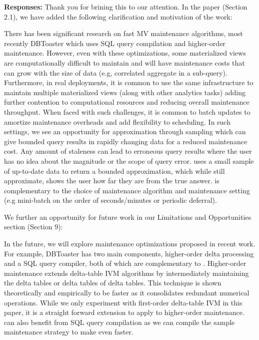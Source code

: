 {\bf Responses:} Thank you for brining this to our attention. In the paper (Section 2.1), we have added the following clarification and motivation of the work:
\begin{displayquote}
There has been significant research on fast MV maintenance algorithms, most recently DBToaster \cite{DBLP:journals/vldb/KochAKNNLS14} which uses SQL query compilation and higher-order maintenance.
However, even with these optimizations, some materialized views are computationally difficult to maintain and will have maintenance costs that can grow with the size of data (e.g, correlated aggregate in a sub-query).
Furthermore, in real deployments, it is common to use the same infrastructure to maintain multiple materialized views (along with other analytics tasks) adding further contention to computational resources and reducing overall maintenance throughput.
When faced with such challenges, it is common to batch updates to amortize maintenance overheads and add flexibility to scheduling.
In such settings, we see an opportunity for approximation through sampling which can give bounded query results in rapidly changing data for a reduced maintenance cost.
Any amount of staleness can lead to erroneous query results where the user has no idea about the magnitude or the scope of query error. 
\svc uses a small sample of up-to-date data to return a bounded approximation, which while still approximate, shows the user how far they are from the true answer.
\svc is complementary to the choice of maintenance algorithm and maintenance setting (e.g mini-batch on the order of seconds/minutes or periodic deferral).
\end{displayquote}

We further an opportunity for future work in our Limitations and Opportunities section (Section 9):
\begin{displayquote}
In the future, we will explore maintenance optimizations proposed in recent work.
For example, DBToaster has two main components, higher-order delta processing and a SQL query compiler, both of which are complementary to \svc.
Higher-order maintenance extends delta-table IVM algorithms by intermediately maintaining the delta tables or delta tables of delta tables.
This technique is shown theoretically and empirically to be faster as it consolidates redundant numerical operations.
While we only experiment with first-order delta-table IVM in this paper, it is a straight forward extension to apply \svc to higher-order maintenance.
\svc can also benefit from SQL query compilation as we can compile the sample maintenance strategy to make \svc even faster.
\end{displayquote}

